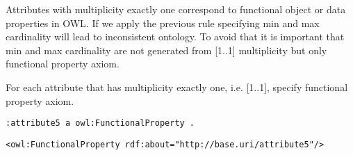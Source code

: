 Attributes with multiplicity exactly one correspond to functional object or data properties in OWL. If we apply the previous rule specifying min and max cardinality will lead to inconsistent ontology. To avoid that it is important that min and max cardinality are not generated from [1..1] multiplicity but only functional property axiom.

\begin{trule}
	\label{rule:attribute-rc-multiplicity-one}
	For each attribute that has multiplicity exactly one, i.e. [1..1], specify functional property axiom.
\end{trule}

\vspace{-\parskip}
\begin{minipage}[b]{.4\textwidth}
\begin{lstlisting}[language=Turtle, caption={Declaring a functional property in Turtle syntax}, captionpos=b]
:attribute5 a owl:FunctionalProperty .
\end{lstlisting}
\end{minipage}%
\quad\vspace{-\parskip}
\begin{minipage}[b]{.6\textwidth}
\begin{lstlisting}[language=RDF/XML, caption={Declaring a functional property in RDF/XML syntax}, captionpos=b]
<owl:FunctionalProperty rdf:about="http://base.uri/attribute5"/>
\end{lstlisting}
\end{minipage}
\vspace{-\parskip}